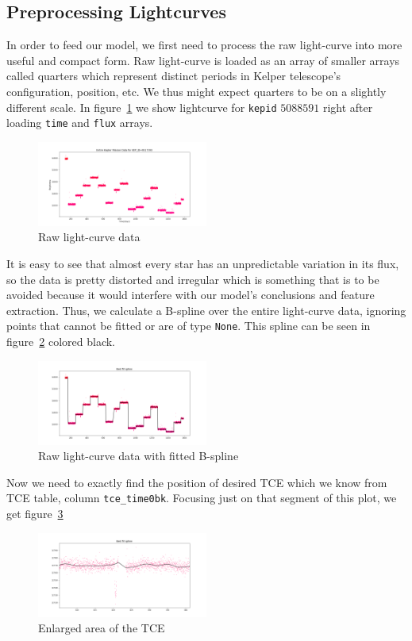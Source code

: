 \documentclass[twoside]{article}
\newcommand{\code}[1]{\texttt{#1}}
\begin{document}
\begin{multicols}{2}
\subsection{Preprocessing Lightcurves}
In order to feed our model, we first need to process the raw light-curve into more useful and compact form. Raw light-curve is loaded as an array of smaller arrays called quarters which represent distinct periods in Kelper telescope's configuration, position, etc. We thus might expect quarters to be on a slightly different scale. In figure~\ref{fig:raw_lc} we show lightcurve for \code{kepid} $5088591$ right after loading \code{time} and \code{flux} arrays.
\begin{figure}[H]
\includegraphics[width=0.5\textwidth]{rawLC-9517393}
\caption{Raw light-curve data}
\label{fig:raw_lc}
\end{figure}

It is easy to see that almost every star has an unpredictable variation in its flux, so the data is pretty distorted and irregular which is something that is to be avoided because it would interfere with our model's conclusions and feature extraction. Thus, we calculate a B-spline over the entire light-curve data, ignoring points that cannot be fitted or are of type \code{None}. This spline can be seen in figure~\ref{fig:raw_spline_lc} colored black.
\begin{figure}[H]
\includegraphics[width=0.5\textwidth]{splineLC-9517393}
\caption{Raw light-curve data with fitted B-spline}
\label{fig:raw_spline_lc}
\end{figure}

Now we need to exactly find the position of desired TCE which we know from TCE table, column \code{tce\_time0bk}. Focusing just on that segment of this plot, we get figure~\ref{fig:enlarged_tce}
\begin{figure}[H]
\includegraphics[width=0.5\textwidth]{splinezoomLC-9517393}
\caption{Enlarged area of the TCE}
\label{fig:enlarged_tce}
\end{figure}


\end{multicols}
\end{document}
